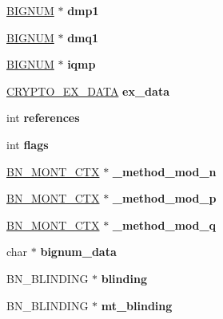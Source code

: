 \begin{DoxyCompactItemize}
\mbox{\label{structrsa__st_ac6f23327027071ef7399f4d72f6c01b7}} 
\hyperlink{structbignum__st}{B\+I\+G\+N\+UM} $\ast$ {\bfseries dmp1}
\item 
\mbox{\label{structrsa__st_afc6066b59b320df8632e9bdc3cce2972}} 
\hyperlink{structbignum__st}{B\+I\+G\+N\+UM} $\ast$ {\bfseries dmq1}
\item 
\mbox{\label{structrsa__st_af686fae5b080774028bc3f41370f57e6}} 
\hyperlink{structbignum__st}{B\+I\+G\+N\+UM} $\ast$ {\bfseries iqmp}
\item 
\mbox{\label{structrsa__st_a721c63c63c45f67f572aaa177e2357ad}} 
\hyperlink{structcrypto__ex__data__st}{C\+R\+Y\+P\+T\+O\+\_\+\+E\+X\+\_\+\+D\+A\+TA} {\bfseries ex\+\_\+data}
\item 
\mbox{\label{structrsa__st_a3b8d372e797fd47606f57789f1c98df9}} 
int {\bfseries references}
\item 
\mbox{\label{structrsa__st_abf88fc039269dcd478fd4436d4b332ae}} 
int {\bfseries flags}
\item 
\mbox{\label{structrsa__st_a3942c90b1f0b16266528f88d14adc6ca}} 
\hyperlink{structbn__mont__ctx__st}{B\+N\+\_\+\+M\+O\+N\+T\+\_\+\+C\+TX} $\ast$ {\bfseries \+\_\+method\+\_\+mod\+\_\+n}
\item 
\mbox{\label{structrsa__st_a468edd0a44ae2aefed076f99f8714ffd}} 
\hyperlink{structbn__mont__ctx__st}{B\+N\+\_\+\+M\+O\+N\+T\+\_\+\+C\+TX} $\ast$ {\bfseries \+\_\+method\+\_\+mod\+\_\+p}
\item 
\mbox{\label{structrsa__st_a463b97b59664b66f0e29881c915a1489}} 
\hyperlink{structbn__mont__ctx__st}{B\+N\+\_\+\+M\+O\+N\+T\+\_\+\+C\+TX} $\ast$ {\bfseries \+\_\+method\+\_\+mod\+\_\+q}
\item 
\mbox{\label{structrsa__st_afa45d273e5fccb2c8f806425aa7f8a4a}} 
char $\ast$ {\bfseries bignum\+\_\+data}
\item 
\mbox{\label{structrsa__st_a953fd4cc8742674450f7a17841c5bcd5}} 
B\+N\+\_\+\+B\+L\+I\+N\+D\+I\+NG $\ast$ {\bfseries blinding}
\item 
\mbox{\label{structrsa__st_a7e167b57f2c8af705b7519cc22458cba}} 
B\+N\+\_\+\+B\+L\+I\+N\+D\+I\+NG $\ast$ {\bfseries mt\+\_\+blinding}
\end{DoxyCompactItemize}


